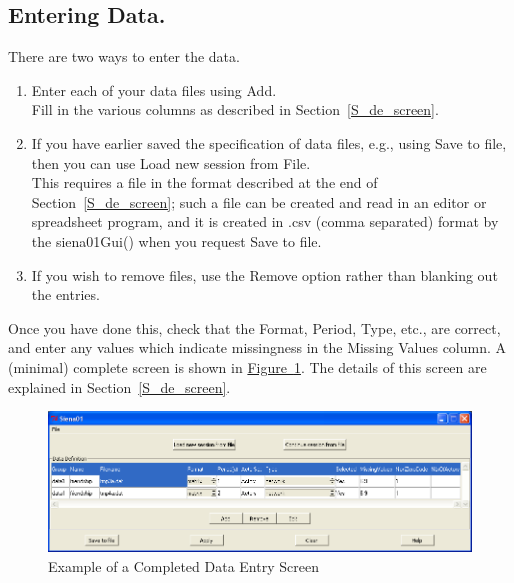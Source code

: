 \documentclass[a4paper,fleqn]{article}
\newcommand{\+}{\, + \,}
\newcommand{\sfn}[1]{\textsf{#1}}
\begin{document}
{\subsection{Entering Data.}
\label{thegui}
There are two ways to enter the data.
\begin{enumerate}
\item Enter each of your data files using \sfn{Add}.\\
      Fill in the various columns as described in Section~\ref{S_de_screen}.
\item If you have earlier saved the specification
      of data files, e.g., using \sfn{Save to file}, then you can
      use \sfn{Load new session from File}.\\
      This requires a file in the format described
      at the end of  Section~\ref{S_de_screen};
      such a file can be created and read in an editor or spreadsheet program,
      and it is created in .csv (comma separated) format
      by the \sfn{ siena01Gui()} when you request
      \sfn{Save to file}.
\item If you wish to remove files, use the \sfn{Remove} option rather than
  blanking out the entries.
\end{enumerate}
Once you have done this, check that the \sfn{Format},
\sfn{Period}, \sfn{Type}, etc., are correct, and enter any
values which indicate missingness in the \sfn{Missing Values} column.
A (minimal) complete screen is shown in \hyperlink{siena2}
{Figure~\ref{fig:siena2}}.
The details of this screen are explained in Section~\ref{S_de_screen}.
  \begin{figure}[ht]
\hypertarget{siena2}{}
    \begin{center}
      \includegraphics[width=\textwidth]{siena2.png}
    \end{center}
 \caption{Example of a Completed Data Entry Screen}
 \label{fig:siena2}
\end{figure}

\newpage
}
\end{document}

